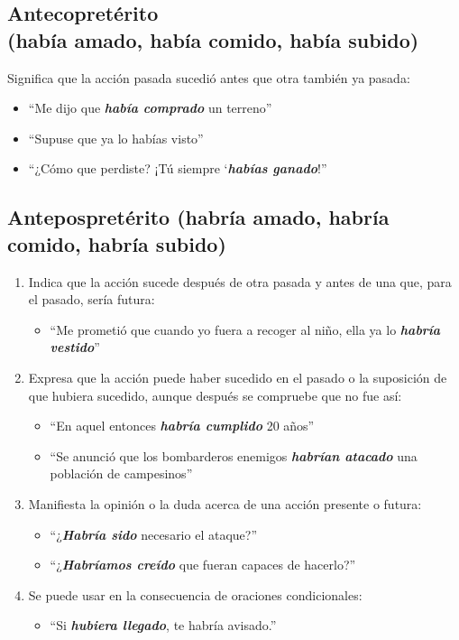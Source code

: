 \documentclass[14pt]{extarticle}
\newcommand{\marcatexto}[1]{\textbf{\textit{#1}}}
\begin{document}
\subsection{Antecopretérito \\ (había amado, había comido, había subido)}

Significa que la acción pasada sucedió antes que otra también ya pasada:
\begin{itemize}
\item \enquote{Me dijo que \marcatexto{había comprado} un terreno}
\item \enquote{Supuse que ya lo \marcatexto{}habías visto}
\item \enquote{¿Cómo que perdiste? ¡Tú siempre `\marcatexto{habías ganado}!}
\end{itemize}

\subsection{Antepospretérito (habría amado, habría comido, habría subido)}

\begin{enumerate}[label=\alph*)]
\item Indica que la acción sucede después de otra pasada y antes de una que, para el pasado, sería futura:
\begin{itemize}
\item \enquote{Me prometió que cuando yo fuera a recoger al niño, ella ya lo \marcatexto{habría vestido}}
\end{itemize}
\item Expresa que la acción puede haber sucedido en el pasado o la suposición de que hubiera sucedido, aunque después se compruebe que no fue así:
\begin{itemize}
\item \enquote{En aquel entonces \marcatexto{habría cumplido} 20 años}
\item \enquote{Se anunció que los bombarderos enemigos \marcatexto{habrían atacado} una población de campesinos}
\end{itemize}
\item Manifiesta la opinión o la duda acerca de una acción presente o futura:
\begin{itemize}
\item \enquote{¿\marcatexto{Habría sido} necesario el ataque?}
\item \enquote{¿\marcatexto{Habríamos creído} que fueran capaces de hacerlo?}
\end{itemize}
\item Se puede usar en la consecuencia de oraciones condicionales:
\begin{itemize}
\item \enquote{Si \marcatexto{hubiera llegado}, te habría avisado.}
\end{itemize}
\end{enumerate}
\end{document}
